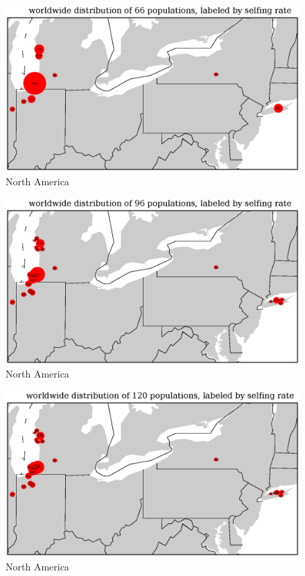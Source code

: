 \documentclass[a4paper,10pt]{article}
\begin{document}
\begin{figure}
\includegraphics[width=1\textwidth]{figures/s0829popid2ecotypeid_25_NorAm__88_38__72_45_l3y1_pop_map.eps}
\caption{North America}\label{f18}
\end{figure}

\begin{figure}
\includegraphics[width=1\textwidth]{figures/s0829popid2ecotypeid_10_NorAm__88_38__72_45_l3y1_pop_map.eps}
\caption{North America}\label{f17}
\end{figure}

\begin{figure}
\includegraphics[width=1\textwidth]{figures/s0829popid2ecotypeid_5_NorAm__88_38__72_45_l3y1_pop_map.eps}
\caption{North America}\label{f16}
\end{figure}
\end{document}
